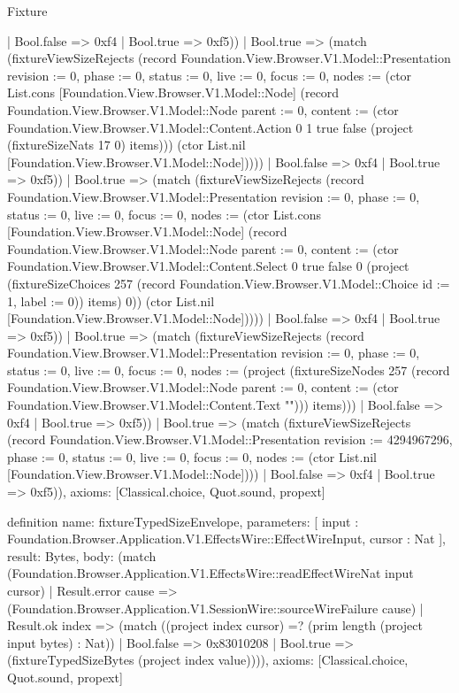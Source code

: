 \begin{lexlean}{Fixture}
\begin{semanticmodule}
{              | Bool.false => 0xf4
              | Bool.true => 0xf5))
          | Bool.true => (match (fixtureViewSizeRejects (record Foundation.View.Browser.V1.Model::Presentation {revision := 0, phase := 0, status := 0, live := 0, focus := 0, nodes := (ctor List.cons [Foundation.View.Browser.V1.Model::Node] (record Foundation.View.Browser.V1.Model::Node {parent := 0, content := (ctor Foundation.View.Browser.V1.Model::Content.Action 0 1 true false (project (fixtureSizeNats 17 0) items))}) (ctor List.nil [Foundation.View.Browser.V1.Model::Node]))}))
            | Bool.false => 0xf4
            | Bool.true => 0xf5))
        | Bool.true => (match (fixtureViewSizeRejects (record Foundation.View.Browser.V1.Model::Presentation {revision := 0, phase := 0, status := 0, live := 0, focus := 0, nodes := (ctor List.cons [Foundation.View.Browser.V1.Model::Node] (record Foundation.View.Browser.V1.Model::Node {parent := 0, content := (ctor Foundation.View.Browser.V1.Model::Content.Select 0 true false 0 (project (fixtureSizeChoices 257 (record Foundation.View.Browser.V1.Model::Choice {id := 1, label := 0})) items) 0)}) (ctor List.nil [Foundation.View.Browser.V1.Model::Node]))}))
          | Bool.false => 0xf4
          | Bool.true => 0xf5))
      | Bool.true => (match (fixtureViewSizeRejects (record Foundation.View.Browser.V1.Model::Presentation {revision := 0, phase := 0, status := 0, live := 0, focus := 0, nodes := (project (fixtureSizeNodes 257 (record Foundation.View.Browser.V1.Model::Node {parent := 0, content := (ctor Foundation.View.Browser.V1.Model::Content.Text "")})) items)}))
        | Bool.false => 0xf4
        | Bool.true => 0xf5))
    | Bool.true => (match (fixtureViewSizeRejects (record Foundation.View.Browser.V1.Model::Presentation {revision := 4294967296, phase := 0, status := 0, live := 0, focus := 0, nodes := (ctor List.nil [Foundation.View.Browser.V1.Model::Node])}))
      | Bool.false => 0xf4
      | Bool.true => 0xf5)),
  axioms: [Classical.choice, Quot.sound, propext]
}

definition{
  name: fixtureTypedSizeEnvelope,
  parameters: [
    input : Foundation.Browser.Application.V1.EffectsWire::EffectWireInput,
    cursor : Nat
  ],
  result: Bytes,
  body: (match (Foundation.Browser.Application.V1.EffectsWire::readEffectWireNat input cursor)
    | Result.error cause => (Foundation.Browser.Application.V1.SessionWire::sourceWireFailure cause)
    | Result.ok index => (match ((project index cursor) =? (prim length (project input bytes) : Nat))
      | Bool.false => 0x83010208
      | Bool.true => (fixtureTypedSizeBytes (project index value)))),
  axioms: [Classical.choice, Quot.sound, propext]
}


\end{semanticmodule}
\end{lexlean}
